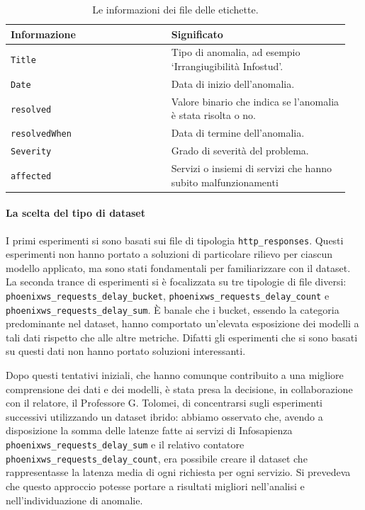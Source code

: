 \begin{table}[H]
    \centering
    \caption{Le informazioni dei file delle etichette.}
    \begin{tabular}{p{0.45\linewidth}p{0.5\linewidth}}
        \toprule
        \textbf{Informazione} & \textbf{Significato} \\
        \toprule
        \texttt{Title} & Tipo di anomalia, ad esempio `Irrangiugibilità Infostud'. \\
        \midrule
        \texttt{Date} & Data di inizio dell'anomalia. \\
        \midrule
        \texttt{resolved} & Valore binario che indica se l'anomalia è stata risolta o no. \\
        \midrule
        \texttt{resolvedWhen} & Data di termine dell'anomalia. \\
        \midrule
        \texttt{Severity} & Grado di severità del problema. \\
        \midrule
        \texttt{affected} & Servizi o insiemi di servizi che hanno subito malfunzionamenti \\
        \bottomrule
    \end{tabular}
    \label{tab:info-labels}
\end{table}

    \paragraph{La scelta del tipo di dataset} \label{cap2:hypothesis} I primi esperimenti si sono basati sui file di tipologia 
    \texttt{http\_responses}. Questi esperimenti non hanno portato a soluzioni di particolare rilievo per 
    ciascun modello applicato, ma sono stati fondamentali per familiarizzare con il dataset. La 
    seconda trance di esperimenti si è focalizzata su tre tipologie di file diversi: 
    \texttt{phoenixws\_requests\_delay\_bucket}, \texttt{phoenixws\_requests\_delay\_count} e 
    \texttt{phoenixws\_requests\_delay\_sum}. È banale che i bucket, essendo la categoria predominante nel 
    dataset, hanno comportato un'elevata esposizione dei modelli a tali dati rispetto che alle altre metriche.
    Difatti gli esperimenti che si sono basati su questi dati non hanno portato soluzioni interessanti. 


    Dopo questi tentativi iniziali, che hanno comunque contribuito a una migliore comprensione dei dati e dei 
    modelli, è stata presa la decisione, in collaborazione con il relatore, il Professore G. Tolomei, di 
    concentrarsi sugli esperimenti successivi utilizzando un dataset ibrido: abbiamo osservato che, 
    avendo a disposizione la somma delle latenze fatte ai servizi di Infosapienza 
    \texttt{phoenixws\_requests\_delay\_sum} e il relativo contatore \texttt{phoenixws\_requests\_delay\_count},
    era possibile creare il dataset che rappresentasse la latenza media di ogni richiesta per ogni servizio. 
    Si prevedeva che questo approccio potesse portare a risultati migliori nell'analisi e nell'individuazione di anomalie.

